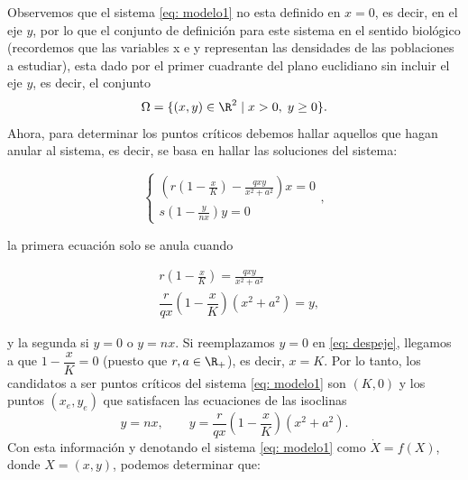 {	Observemos que el sistema \eqref{eq: modelo1} no esta definido en $x=0$, es decir, en el eje $y$, por lo que el conjunto de definición para este sistema en el sentido biológico (recordemos que las variables x e y representan las densidades de las poblaciones a estudiar), esta dado por el primer cuadrante del plano euclidiano sin incluir el eje $y$, es decir, el conjunto $$\Omega = \{ (x,y) \in \R^{2} \; | \; x>0, \; y \geq 0 \}.$$ Ahora, para determinar los puntos críticos debemos hallar aquellos que hagan anular al sistema, es decir, se basa en hallar las soluciones del sistema:
	
	\begin{equation}
		\begin{cases} 
			(r \left(1 - \frac{x}{K}\right) - \frac{q x y}{x^2 + a^2})x = 0\\ 
			s \left(1 - \frac{y}{n x}\right) y = 0
		\end{cases},
	\end{equation}
	
	la primera ecuación solo se anula cuando
	
	\begin{equation}
		\begin{aligned}
			& r \left(1 - \frac{x}{K}\right) = \frac{q x y}{x^2 + a^2} \\
			& \dfrac{r}{qx} \left( 1-\dfrac{x}{K} \right) (x^2+a^2) = y,
		\end{aligned}
		\label{eq: despeje}
	\end{equation}
	
	y la segunda si $y = 0$ o $y = nx$. Si reemplazamos $y=0$ en \eqref{eq: despeje}, llegamos a que $1-\dfrac{x}{K} = 0$ (puesto que $r,a \in \R_{+}$), es decir, $x = K$. Por lo tanto, los candidatos a ser puntos críticos del sistema \eqref{eq: modelo1} son $(K,0)$ y los puntos $(x_{e},y_{e})$ que satisfacen las ecuaciones de las isoclinas
	\begin{equation}
		y=nx, \qquad y= \dfrac{r}{qx} \left( 1-\dfrac{x}{K} \right) (x^2+a^2).
	\end{equation}
	Con esta información y denotando el sistema \eqref{eq: modelo1} como $\dot{X}=f(X)$, donde $X=(x,y)$, podemos determinar que:
	
}
